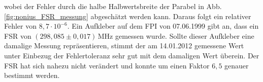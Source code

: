 wobei der Fehler durch die halbe Halbwertsbreite der Parabel in Abb.
\ref{fig:nonius_FSR_messung} abgeschätzt
werden kann. Daraus folgt ein relativer Fehler von $8,7\cdot10^{-6}$. Ein Aufkleber auf dem FPI von
07.06.1999 gibt an, dass ein FSR von $(298,085\pm0,017)\,$MHz gemessen wurde.
Sollte dieser Aufkleber eine damalige Messung repräsentieren, stimmt der
am 14.01.2012 gemessene Wert unter Einbezug der Fehlertoleranz sehr gut mit dem
damaligen Wert überein. Der FSR hat sich nahezu nicht verändert und konnte um
einen Faktor $6,5$ genauer bestimmt werden.
\begin{figure}[h]
 	\centering
\end{figure}
